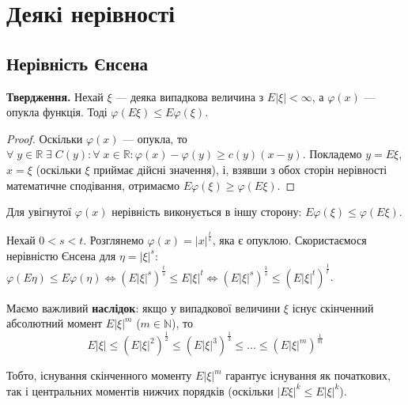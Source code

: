 \section{Деякі нерівності}
\subsection{Нерівність Єнсена}

\noindent\textbf{Твердження.} Нехай $\xi$ --- деяка випадкова величина
з $E|\xi| < \infty$, а $\varphi(x)$ --- опукла функція. Тоді $\varphi(E\xi) \leq E\varphi(\xi)$.
\begin{proof}
    Оскільки $\varphi(x)$ --- опукла, то $\forall \; y \in \mathbb{R} \;\exists \; C(y): \forall \; x \in \mathbb{R}: \varphi(x) - \varphi(y) \geq c(y)(x-y)$.
    Покладемо $y = E\xi$, $x = \xi$ (оскільки $\xi$ приймає дійсні значення), і, взявши з обох сторін нерівності математичне сподівання,
    отримаємо $E\varphi(\xi) \geq \varphi(E\xi)$. 
\end{proof}
\begin{remark}
    Для увігнутої $\varphi(x)$ нерівність виконується в іншу сторону: $E\varphi(\xi) \leq \varphi(E\xi)$.
\end{remark}
\begin{example}
    Нехай $0 < s < t$. Розглянемо $\varphi(x) = |x|^{\frac{t}{s}}$, яка є опуклою. Скористаємося нерівністю
    Єнсена для $\eta = \left| \xi\right|^s$:
    $\varphi(E\eta) \leq E\varphi(\eta) \Leftrightarrow \left( E \left| \xi\right|^s\right)^{\frac{t}{s}} \leq E \left| \xi\right|^t 
    \Leftrightarrow ( E \left| \xi\right|^s)^{\frac{1}{s}} \leq ( E \left| \xi\right|^t)^{\frac{1}{t}}$.

    Маємо важливий \textbf{наслідок}: якщо у випадкової величини $\xi$ існує скінченний абсолютний момент $E\left|\xi\right|^m$ ($m\in \mathbb{N}$), то
    $$E \left| \xi\right| \leq (E \left| \xi\right|^2)^{\frac{1}{2}} \leq (E \left| \xi\right|^3)^{\frac{1}{3}} \leq ... \leq ( E \left| \xi\right|^m)^{\frac{1}{m}}$$

    Тобто, існування скінченного моменту $E\left|\xi\right|^m$ гарантує існування як початкових, так і центральних моментів нижчих порядків
    (оскільки $\left| E\xi \right|^k \leq E\left|\xi\right|^k$).
\end{example}

